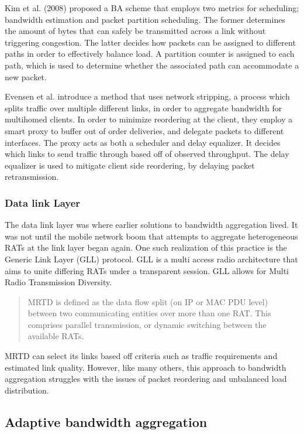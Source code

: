 \documentclass[12pt]{article}
\begin{document}
		Kim et al. (2008) proposed a BA scheme that employs two metrics for scheduling; bandwidth estimation and packet partition scheduling. The former determines the amount of bytes that can safely be transmitted across a link without triggering congestion. The latter decides how packets can be assigned to different paths in order to effectively balance load. A partition counter is assigned to each path, which is used to determine whether the associated path can accommodate a new packet\cite{kim2008packet}.

		Evensen et al. introduce a method that uses network stripping, a process which splits traffic over multiple different links, in order to aggregate bandwidth for multihomed clients. In order to minimize reordering at the client, they employ a smart proxy to buffer out of order deliveries, and delegate packets to different interfaces. The proxy acts as both a scheduler and delay equalizer. It decides which links to send traffic through based off of observed throughput. The delay equalizer is used to mitigate client side reordering, by delaying packet retransmission\cite{5355198}.

	\subsubsection{Data link Layer}
		The data link layer was where earlier solutions to bandwidth aggregation lived. It was not until the mobile network boom that attempts to aggregate heterogeneous RATs at the link layer began again. One such realization of this practice is the Generic Link Layer (GLL) protocol. GLL is a multi access radio architecture that aims to unite differing RATs under a transparent session. GLL allows for Multi Radio Transmission Diversity.
		\begin{quote}
			MRTD is defined as the data flow split (on IP or MAC PDU level) between two communicating entities over more than one RAT. This comprises parallel transmission, or dynamic switching between the available RATs.\cite{GLL:2005}
		\end{quote}
		MRTD can select its links based off criteria such as traffic requirements and estimated link quality. However, like many others, this approach to bandwidth aggregation struggles with the issues of packet reordering and unbalanced load distribution\cite{Ramaboli20121674}.

\subsection{Adaptive bandwidth aggregation}
\end{document}
